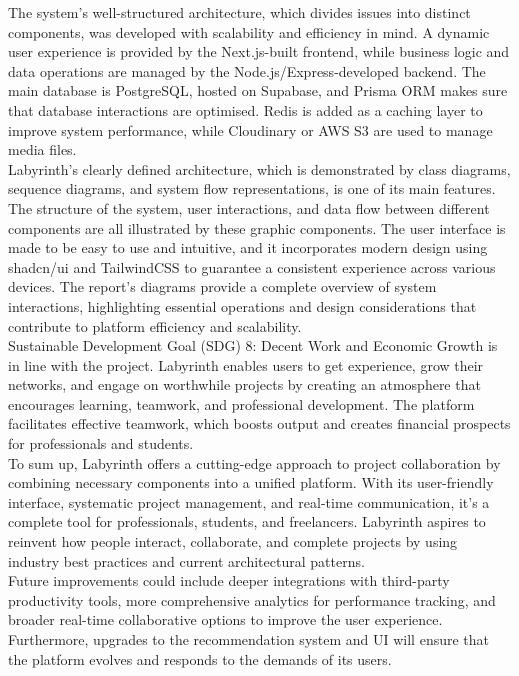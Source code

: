 \documentclass{FastFyp}
\begin{document}
The system's well-structured architecture, which divides issues into distinct components, was developed with scalability and efficiency in mind.  A dynamic user experience is provided by the Next.js-built frontend, while business logic and data operations are managed by the Node.js/Express-developed backend.  The main database is PostgreSQL, hosted on Supabase, and Prisma ORM makes sure that database interactions are optimised.  Redis is added as a caching layer to improve system performance, while Cloudinary or AWS S3 are used to manage media files.\\
Labyrinth's clearly defined architecture, which is demonstrated by class diagrams, sequence diagrams, and system flow representations, is one of its main features.  The structure of the system, user interactions, and data flow between different components are all illustrated by these graphic components.  The user interface is made to be easy to use and intuitive, and it incorporates modern design using shadcn/ui and TailwindCSS to guarantee a consistent experience across various devices.  The report's diagrams provide a complete overview of system interactions, highlighting essential operations and design considerations that contribute to platform efficiency and scalability.\\
Sustainable Development Goal (SDG) 8: Decent Work and Economic Growth is in line with the project.  Labyrinth enables users to get experience, grow their networks, and engage on worthwhile projects by creating an atmosphere that encourages learning, teamwork, and professional development.  The platform facilitates effective teamwork, which boosts output and creates financial prospects for professionals and students.\\
To sum up, Labyrinth offers a cutting-edge approach to project collaboration by combining necessary components into a unified platform.  With its user-friendly interface, systematic project management, and real-time communication, it's a complete tool for professionals, students, and freelancers.  Labyrinth aspires to reinvent how people interact, collaborate, and complete projects by using industry best practices and current architectural patterns.\\ 
Future improvements could include deeper integrations with third-party productivity tools, more comprehensive analytics for performance tracking, and broader real-time collaborative options to improve the user experience.  Furthermore, upgrades to the recommendation system and UI will ensure that the platform evolves and responds to the demands of its users.
\end{document}
